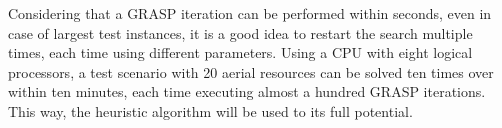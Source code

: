 Considering that a GRASP iteration can be performed within seconds, even in case of largest test instances, it is a good idea to restart the search multiple times, each time using different parameters.
Using a CPU with eight logical processors, a test scenario with 20 aerial resources can be solved ten times over within ten minutes, each time executing almost a hundred GRASP iterations.
This way, the heuristic algorithm will be used to its full potential.
